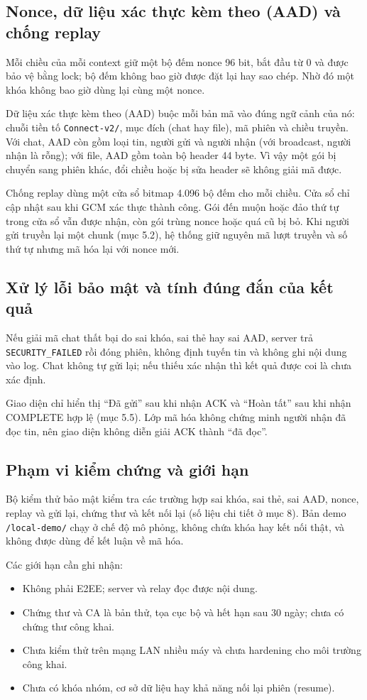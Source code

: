\subsection{Nonce, dữ liệu xác thực kèm theo (AAD) và chống replay}
Mỗi chiều của mỗi context giữ một bộ đếm nonce 96 bit, bắt đầu từ 0 và được bảo vệ bằng lock; bộ đếm không bao giờ được đặt lại hay sao chép. Nhờ đó một khóa không bao giờ dùng lại cùng một nonce.

Dữ liệu xác thực kèm theo (AAD) buộc mỗi bản mã vào đúng ngữ cảnh của nó: chuỗi tiền tố \texttt{Connect-v2/}, mục đích (chat hay file), mã phiên và chiều truyền. Với chat, AAD còn gồm loại tin, người gửi và người nhận (với broadcast, người nhận là rỗng); với file, AAD gồm toàn bộ header 44 byte. Vì vậy một gói bị chuyển sang phiên khác, đổi chiều hoặc bị sửa header sẽ không giải mã được.

Chống replay dùng một cửa sổ bitmap 4.096 bộ đếm cho mỗi chiều. Cửa sổ chỉ cập nhật sau khi GCM xác thực thành công. Gói đến muộn hoặc đảo thứ tự trong cửa sổ vẫn được nhận, còn gói trùng nonce hoặc quá cũ bị bỏ. Khi người gửi truyền lại một chunk (mục 5.2), hệ thống giữ nguyên mã lượt truyền và số thứ tự nhưng mã hóa lại với nonce mới.

\subsection{Xử lý lỗi bảo mật và tính đúng đắn của kết quả}
Nếu giải mã chat thất bại do sai khóa, sai thẻ hay sai AAD, server trả \texttt{SECURITY\_FAILED} rồi đóng phiên, không định tuyến tin và không ghi nội dung vào log. Chat không tự gửi lại; nếu thiếu xác nhận thì kết quả được coi là chưa xác định.

Giao diện chỉ hiển thị “Đã gửi” sau khi nhận ACK và “Hoàn tất” sau khi nhận COMPLETE hợp lệ (mục 5.5). Lớp mã hóa không chứng minh người nhận đã đọc tin, nên giao diện không diễn giải ACK thành “đã đọc”.

\subsection{Phạm vi kiểm chứng và giới hạn}
Bộ kiểm thử bảo mật kiểm tra các trường hợp sai khóa, sai thẻ, sai AAD, nonce, replay và gửi lại, chứng thư và kết nối lại (số liệu chi tiết ở mục 8). Bản demo \texttt{/local-demo/} chạy ở chế độ mô phỏng, không chứa khóa hay kết nối thật, và không được dùng để kết luận về mã hóa.

Các giới hạn cần ghi nhận:
\begin{itemize}
    \item Không phải E2EE; server và relay đọc được nội dung.
    \item Chứng thư và CA là bản thử, tọa cục bộ và hết hạn sau 30 ngày; chưa có chứng thư công khai.
    \item Chưa kiểm thử trên mạng LAN nhiều máy và chưa hardening cho môi trường công khai.
    \item Chưa có khóa nhóm, cơ sở dữ liệu hay khả năng nối lại phiên (resume).
\end{itemize}